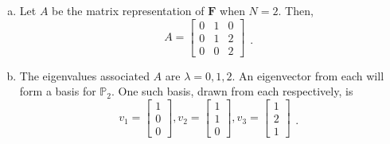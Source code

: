 \documentclass[12pt]{amsart}
\newcommand{\1}{\mathbbm{1}}
\newcommand{\la}{\lambda}
\numberwithin{equation}{section}
\numberwithin{Theorem}{section}
\theoremstyle{plain} %
\theoremstyle{definition}
\theoremstyle{remark}
\begin{document}
\begin{enumerate}[1.]
\begin{enumerate}[(a)]
	\item 
	Let $A$ be the matrix representation of $\mathbf{F}$ when \(N=2\). Then,
	\[A = \begin{bmatrix}
		0 & 1 & 0 \\
		0 & 1 & 2 \\
		0 & 0 & 2
	\end{bmatrix}\begin{matrix}\\ \\.\end{matrix}\] \bigskip

	\item
	The eigenvalues associated $A$ are \(\la=0,1,2\). An eigenvector from each will form a basis for \(\mathbb{P}_2\). One such basis, drawn from each respectively, is
	\[
	v_1 = \begin{bmatrix} 1 \\ 0 \\ 0 \end{bmatrix},
	v_2 = \begin{bmatrix} 1 \\ 1 \\ 0 \end{bmatrix},
	v_3 = \begin{bmatrix} 1 \\ 2 \\ 1 \end{bmatrix}
	\begin{matrix}  \\  \\ . \end{matrix} 
	\] \bigskip
	

\end{enumerate}
\end{enumerate}
\end{document}
